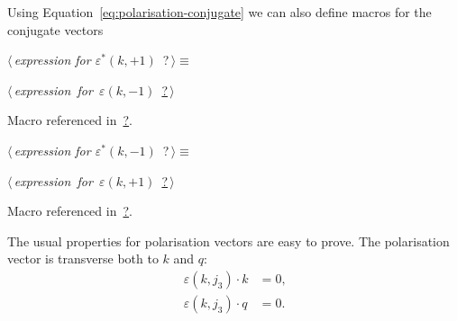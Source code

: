 \documentclass[a4paper,12pt]{amsart}
\renewcommand{\NWtarget}[2]{\hypertarget{#1}{#2}}
\renewcommand{\NWlink}[2]{\hyperlink{#1}{#2}}
\renewcommand{\NWtxtMacroRefIn}{Macro referenced in}
\renewcommand{\NWsep}{${\diamond}$}
\begin{document}
Using Equation~\eqref{eq:polarisation-conjugate} we can also
define macros for the conjugate vectors
\begin{flushleft} \small
\begin{minipage}{\linewidth}\label{scrap21}\raggedright\small
\NWtarget{nuweb?}{} $\langle\,${\it expression for $\varepsilon^\ast(k, +1)$}\nobreak\ {\footnotesize {?}}$\,\rangle\equiv$
\vspace{-1ex}
\begin{list}{}{} \item
\mbox{}\verb@@\hbox{$\langle\,${\it expression for $\varepsilon(k, -1)$}\nobreak\ {\footnotesize \NWlink{nuweb?}{?}}$\,\rangle$}\verb@@{\NWsep}
\end{list}
\vspace{-1.5ex}
\footnotesize
\begin{list}{}{\setlength{\itemsep}{-\parsep}\setlength{\itemindent}{-\leftmargin}}
\item \NWtxtMacroRefIn\ \NWlink{nuweb?}{?}.

\item{}
\end{list}
\end{minipage}\vspace{4ex}
\end{flushleft}
\begin{flushleft} \small
\begin{minipage}{\linewidth}\label{scrap22}\raggedright\small
\NWtarget{nuweb?}{} $\langle\,${\it expression for $\varepsilon^\ast(k, -1)$}\nobreak\ {\footnotesize {?}}$\,\rangle\equiv$
\vspace{-1ex}
\begin{list}{}{} \item
\mbox{}\verb@@\hbox{$\langle\,${\it expression for $\varepsilon(k, +1)$}\nobreak\ {\footnotesize \NWlink{nuweb?}{?}}$\,\rangle$}\verb@@{\NWsep}
\end{list}
\vspace{-1.5ex}
\footnotesize
\begin{list}{}{\setlength{\itemsep}{-\parsep}\setlength{\itemindent}{-\leftmargin}}
\item \NWtxtMacroRefIn\ \NWlink{nuweb?}{?}.

\item{}
\end{list}
\end{minipage}\vspace{4ex}
\end{flushleft}
The usual properties for polarisation vectors are easy to prove. The
polarisation vector is transverse both to $k$ and $q$:
\begin{align}
\varepsilon(k, j_3)\cdot k &= 0\text{,}\\
\varepsilon(k, j_3)\cdot q &= 0\text{.}
\end{align}
\end{document}
